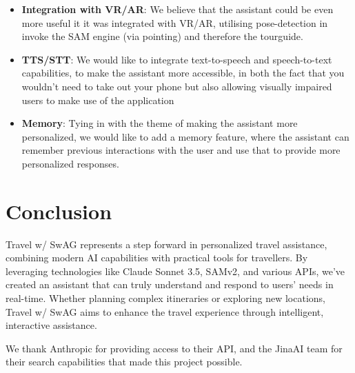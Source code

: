 \documentclass{article}
\begin{document}
\begin{itemize}
\item \textbf{Integration with VR/AR}: We believe that the assistant could be even more useful it it was integrated with VR/AR, utilising pose-detection in invoke the SAM engine (via pointing) and therefore the tourguide.
\item \textbf{TTS/STT}: We would like to integrate text-to-speech and speech-to-text capabilities, to make the assistant more accessible, in both the fact that you wouldn't need to take out your phone but also allowing visually impaired users to make use of the application
\item \textbf{Memory}: Tying in with the theme of making the assistant more personalized, we would like to add a memory feature, where the assistant can remember previous interactions with the user and use that to provide more personalized responses.
\end{itemize}

\section{Conclusion}

Travel w/ SwAG represents a step forward in personalized travel assistance, combining modern AI capabilities with practical tools for travellers. By leveraging technologies like Claude Sonnet 3.5, SAMv2, and various APIs, we've created an assistant that can truly understand and respond to users' needs in real-time. Whether planning complex itineraries or exploring new locations, Travel w/ SwAG aims to enhance the travel experience through intelligent, interactive assistance.

We thank Anthropic for providing access to their API, and the JinaAI team for their search capabilities that made this project possible.
\end{document}
